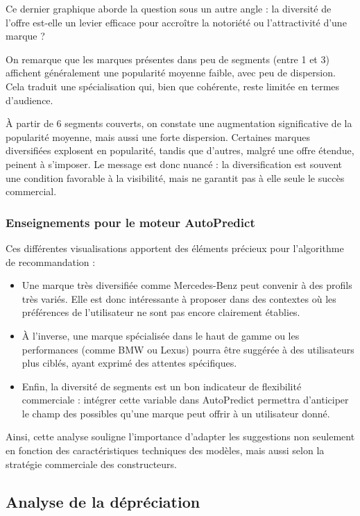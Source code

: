 \documentclass[12pt]{report}
\begin{document}
Ce dernier graphique aborde la question sous un autre angle : la diversité de l’offre est-elle un levier efficace pour accroître la notoriété ou l’attractivité d’une marque ?

On remarque que les marques présentes dans peu de segments (entre 1 et 3) affichent généralement une popularité moyenne faible, avec peu de dispersion. Cela traduit une spécialisation qui, bien que cohérente, reste limitée en termes d’audience.

À partir de 6 segments couverts, on constate une augmentation significative de la popularité moyenne, mais aussi une forte dispersion. Certaines marques diversifiées explosent en popularité, tandis que d’autres, malgré une offre étendue, peinent à s’imposer. Le message est donc nuancé : la diversification est souvent une condition favorable à la visibilité, mais ne garantit pas à elle seule le succès commercial.

\subsubsection{Enseignements pour le moteur AutoPredict}

Ces différentes visualisations apportent des éléments précieux pour l’algorithme de recommandation :

\begin{itemize}
    \item Une marque très diversifiée comme Mercedes-Benz peut convenir à des profils très variés. Elle est donc intéressante à proposer dans des contextes où les préférences de l’utilisateur ne sont pas encore clairement établies.
    \item À l’inverse, une marque spécialisée dans le haut de gamme ou les performances (comme BMW ou Lexus) pourra être suggérée à des utilisateurs plus ciblés, ayant exprimé des attentes spécifiques.
    \item Enfin, la diversité de segments est un bon indicateur de flexibilité commerciale : intégrer cette variable dans AutoPredict permettra d’anticiper le champ des possibles qu’une marque peut offrir à un utilisateur donné.
\end{itemize}

Ainsi, cette analyse souligne l’importance d’adapter les suggestions non seulement en fonction des caractéristiques techniques des modèles, mais aussi selon la stratégie commerciale des constructeurs.


\subsection{Analyse de la dépréciation}
\end{document}
